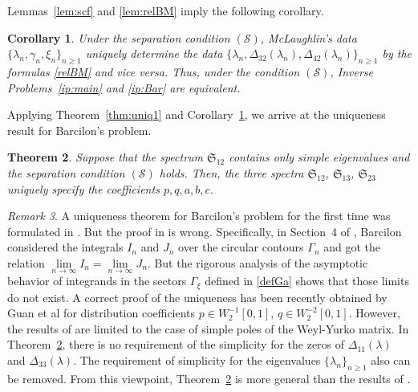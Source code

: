 \documentclass[a4paper,12pt]{article}
\newcommand{\ga}{\gamma}
\newcommand{\la}{\lambda}
\theoremstyle{plain}
\numberwithin{equation}{section}
\newtheorem{thm}{Theorem}[section]
\newtheorem{cor}[thm]{Corollary}
\theoremstyle{definition}
\theoremstyle{remark}
\newtheorem{remark}[thm]{Remark}
\begin{document}
Lemmas~\ref{lem:scf} and \ref{lem:relBM} imply the following corollary.

\begin{cor} \label{cor:equivBM}
Under the separation condition $(\mathcal S)$, McLaughlin's data $\{ \la_n, \ga_n, \xi_n \}_{n \ge 1}$ uniquely determine the data $\{ \la_n, \Delta_{32}(\la_n), \Delta_{42}(\la_n) \}_{n \ge 1}$ by the formulas \eqref{relBM} and vice versa. Thus, under the condition $(\mathcal S)$, Inverse Problems~\ref{ip:main} and \ref{ip:Bar} are equivalent.
\end{cor}

Applying Theorem~\ref{thm:uniq1} and Corollary~\ref{cor:equivBM}, we arrive at the uniqueness result for Barcilon's problem.

\begin{thm} \label{thm:Bar}
Suppose that the spectrum $\mathfrak S_{12}$ contains only simple eigenvalues and the separation condition $(\mathcal S)$ holds. Then, the three spectra $\mathfrak S_{12}$, $\mathfrak S_{13}$, $\mathfrak S_{23}$ uniquely specify the coefficients $p, q, a, b, c$.
\end{thm}

\begin{remark}
A uniqueness theorem for Barcilon's problem for the first time was formulated in \cite{Bar74-1}. But the proof in \cite{Bar74-1} is wrong. Specifically, in Section~4 of \cite{Bar74-1}, Barcilon considered the integrals $I_n$ and $J_n$ over the circular contours $\Gamma_n$ and got the relation $\lim\limits_{n \to \infty} I_n = \lim\limits_{n \to \infty} J_n$. But the rigorous analysis of the asymptotic behavior of integrands in the sectors $\Gamma_{\xi}$ defined in \eqref{defGa} shows that those limits do not exist. 
A correct proof of the uniqueness has been recently obtained by Guan et al \cite{GYB23} for distribution coefficients $p \in W_2^{-1}[0,1]$, $q \in W_2^{-2}[0,1]$. However, the results of \cite{GYB23} are limited to the case of simple poles of the Weyl-Yurko matrix. In Theorem~\ref{thm:Bar}, there is no requirement of the simplicity for the zeros of $\Delta_{11}(\la)$ and $\Delta_{33}(\la)$. The requirement of simplicity for the eigenvalues $\{ \la_n \}_{n \ge 1}$ also can be removed. From this viewpoint, Theorem~\ref{thm:Bar} is more general than the results of \cite{GYB23}.
\end{remark}
\end{document}
